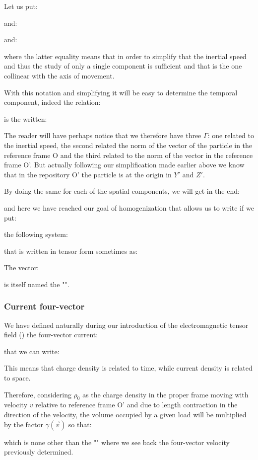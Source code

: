 	Let us put:
	
	and:
	
	and:
	
	where the latter equality means that in order to simplify that the inertial speed and thus the study of only a single component is sufficient and that is the one collinear with the axis of movement.

	With this notation and simplifying it will be easy to determine the temporal component, indeed the relation:
	
	is the written:
	
	The reader will have perhaps notice that we therefore have three $\Gamma$: one related to the inertial speed, the second related the norm of the vector of the particle in the reference frame O and the third related to the norm of the vector in the reference frame O'. But actually following our simplification made earlier above we know that in the repository O' the particle is at the origin in $Y'$ and $Z'$.

	By doing the same for each of the spatial components, we will get in the end:
	
	and here we have reached our goal of homogenization that allows us to write if we put:
	
	the following system:
	
	that is written in tensor form  sometimes as:
	
	The vector:
	
	is itself named the "".
	
	\subsubsection{Current four-vector}
	We have defined naturally during our introduction of the electromagnetic tensor field () the four-vector current:
	
	that we can write:
	
	This means that charge density is related to time, while current density is related to space.
	
	Therefore, considering $\rho_0$ as the charge density in the proper frame moving with velocity $v$ relative to reference frame O' and due to length contraction in the direction of the velocity, the volume occupied by a given load will be multiplied by the factor $\gamma(\vec{v})$ so that:
	
	which is none other than the "" where we see back the four-vector velocity previously determined.
	
